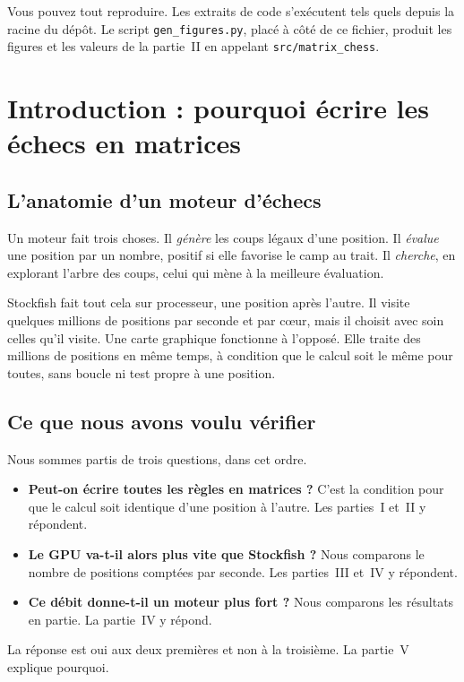 \documentclass[11pt,a4paper]{article}
\newcommand{\code}[1]{\texttt{#1}}
\newcounter{calcul}
\theoremstyle{plain}
\begin{document}
Vous pouvez tout reproduire. Les extraits de code s'exécutent tels quels depuis la racine du
dépôt. Le script \code{gen\_figures.py}, placé à côté de ce fichier, produit les figures et les
valeurs de la partie~II en appelant \code{src/matrix\_chess}.

\section{Introduction : pourquoi écrire les échecs en matrices}

\subsection*{L'anatomie d'un moteur d'échecs}
Un moteur fait trois choses. Il \emph{génère} les coups légaux d'une position. Il \emph{évalue}
une position par un nombre, positif si elle favorise le camp au trait. Il \emph{cherche}, en
explorant l'arbre des coups, celui qui mène à la meilleure évaluation.

Stockfish fait tout cela sur processeur, une position après l'autre. Il visite quelques millions
de positions par seconde et par cœur, mais il choisit avec soin celles qu'il visite. Une carte
graphique fonctionne à l'opposé. Elle traite des millions de positions en même temps, à
condition que le calcul soit le même pour toutes, sans boucle ni test propre à une position.

\subsection*{Ce que nous avons voulu vérifier}
Nous sommes partis de trois questions, dans cet ordre.
\begin{itemize}
\item \textbf{Peut-on écrire toutes les règles en matrices ?} C'est la condition pour que le
calcul soit identique d'une position à l'autre. Les parties~I et~II y répondent.
\item \textbf{Le GPU va-t-il alors plus vite que Stockfish ?} Nous comparons le nombre de
positions comptées par seconde. Les parties~III et~IV y répondent.
\item \textbf{Ce débit donne-t-il un moteur plus fort ?} Nous comparons les résultats en partie.
La partie~IV y répond.
\end{itemize}
La réponse est oui aux deux premières et non à la troisième. La partie~V explique pourquoi.
\end{document}
